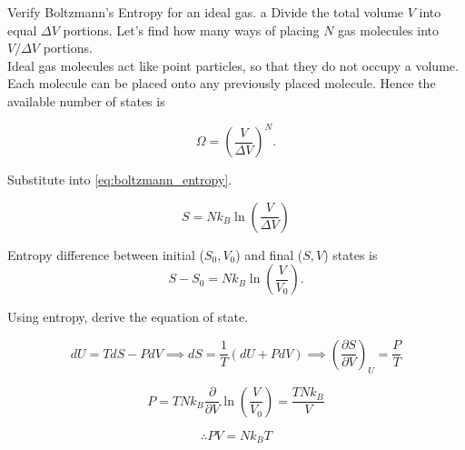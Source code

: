 \begin{problem}{Verify Boltzmann's Entropy for an ideal gas.}
a Divide the total volume $V$ into equal $\Delta V$ portions. Let's find how many ways of placing $N$ gas molecules into $V/\Delta V$ portions. \\
Ideal gas molecules act like point particles, so that they do not occupy a volume. Each molecule can be placed onto any previously placed molecule. Hence the available number of states is

\begin{equation}
    \Omega=\left(\frac{V}{\Delta V}\right)^N .
\end{equation}

Substitute into \ref{eq:boltzmann_entropy}.

\begin{equation}
    S=Nk_B\ln{\left(\frac{V}{\Delta V}\right)}
\end{equation}

Entropy difference between initial ($S_0, V_0$) and final ($S, V$) states is
\begin{equation}
    S - S_0=Nk_B\ln{\left(\frac{V}{V_0}\right)}.
\end{equation}

Using entropy, derive the equation of state.

\begin{equation}
    dU = TdS-PdV \implies dS=\frac{1}{T}(dU+PdV) \implies \left(\frac{\partial S}{\partial V} \right)_U = \frac{P}{T}
\end{equation}

\begin{equation}
    P=TNk_B\frac{\partial}{\partial V}\ln{\left(\frac{V}{V_0}\right)}=\frac{TNk_B}{V}
\end{equation}

\begin{equation}
    \therefore PV=Nk_B T
\end{equation}
    
\end{problem}

